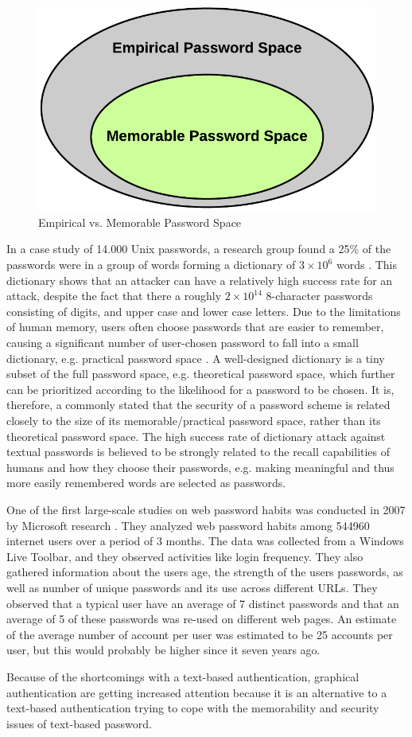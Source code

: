   \begin{figure}[H]
      \centering
      \includegraphics[scale=0.25]{pics/EmpiricalVsPractical.png}
      \caption{Empirical vs. Memorable Password Space}
      \label{fig:memorable}
    \end{figure}

  In a case study of 14.000 Unix passwords, a research group found a 25\% of the passwords were in a group of words forming a dictionary of $3\times10^{6}$ words \cite{UnixPasswords}. This dictionary shows that an attacker can have a relatively high success rate for an attack, despite the fact that there a roughly $2\times10^{14}$ 8-character passwords consisting of digits, and upper case and lower case letters. Due to the limitations of human memory, users often choose passwords that are easier to remember, causing a significant number of user-chosen password to fall into a small dictionary, e.g. practical password space \cite{Tao}. A well-designed dictionary is a tiny subset of the full password space, e.g. theoretical password space, which further can be prioritized according to the likelihood for a password to be chosen. It is, therefore, a commonly stated that the security of a password scheme is related closely to the size of its memorable/practical password space, rather than its theoretical password space. The high success rate of dictionary attack against textual passwords is believed to be strongly related to the recall capabilities of humans and how they choose their passwords, e.g. making meaningful and thus more easily remembered words are selected as passwords.

  One of the first large-scale studies on web password habits was conducted in 2007 by Microsoft research \cite{habits1}. They analyzed web password habits among 544960 internet users over a period of 3 months. The data was collected from a Windows Live Toolbar, and they observed activities like login frequency. They also gathered information about the users age, the strength of the users passwords, as well as number of unique passwords and its use across different URLs. They observed that a typical user have an average of 7 distinct passwords and that an average of 5 of these passwords was re-used on different web pages. An estimate of the average number of account per user was estimated to be 25 accounts per user, but this would probably be higher since it seven years ago. 

  Because of the shortcomings with a text-based authentication, graphical authentication are getting increased attention because it is an alternative to a text-based authentication trying to cope with the memorability and security issues of text-based password.